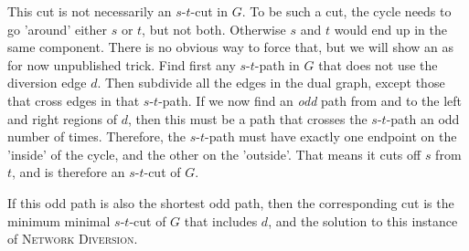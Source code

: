 This cut is not necessarily an $s$-$t$-cut in $G$. To be such a cut, the cycle needs to go 'around' either $s$ or $t$, but not both. Otherwise $s$ and $t$ would end up in the same component. There is no obvious way to force that, but we will show an as for now unpublished trick. Find first any $s$-$t$-path in $G$ that does not use the diversion edge $d$. Then subdivide all the edges in the dual graph, except those that cross edges in that $s$-$t$-path. If we now find an \emph{odd} path from and to the left and right regions of $d$, then this must be a path that crosses the $s$-$t$-path an odd number of times. Therefore, the $s$-$t$-path must have exactly one endpoint on the 'inside' of the cycle, and the other on the 'outside'. That means it cuts off $s$ from $t$, and is therefore an $s$-$t$-cut of $G$. 

If this odd path is also the shortest odd path, then the corresponding cut is the minimum minimal $s$-$t$-cut of $G$ that includes $d$, and the solution to this instance of \textsc{Network Diversion}.


